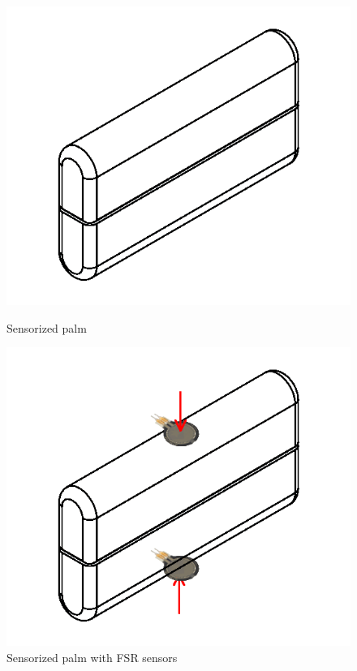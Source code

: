 \begin{figure}[h]
  \centering
  \begin{minipage}[b]{0.4\textwidth}
    \includegraphics[width=\textwidth]{Figure/dummipalm.png}
    \caption{Sensorized palm}
  \label{fig:dummi}
  \end{minipage}
  \hfill
  \begin{minipage}[b]{0.4\textwidth}
    \includegraphics[width=\textwidth]{Figure/dummipalmfsr.png}
    \caption{Sensorized palm with FSR sensors}
    \label{fig:dummifsr}
  \end{minipage}
\end{figure}

